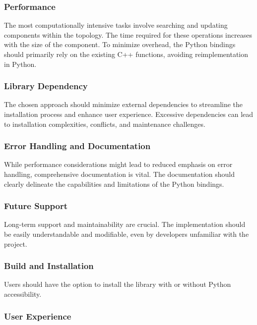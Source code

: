 \subsubsection{Performance}

The most computationally intensive tasks involve searching and updating components within the topology. The time required for these operations increases with the size of the component. To minimize overhead, the Python bindings should primarily rely on the existing C++ functions, avoiding reimplementation in Python.

\subsubsection{Library Dependency}

The chosen approach should minimize external dependencies to streamline the installation process and enhance user experience. Excessive dependencies can lead to installation complexities, conflicts, and maintenance challenges.

\subsubsection{Error Handling and Documentation}

While performance considerations might lead to reduced emphasis on error handling, comprehensive documentation is vital. The documentation should clearly delineate the capabilities and limitations of the Python bindings.

\subsubsection{Future Support}

Long-term support and maintainability are crucial. The implementation should be easily understandable and modifiable, even by developers unfamiliar with the project.

\subsubsection{Build and Installation}

Users should have the option to install the library with or without Python accessibility.

\subsubsection{User Experience}

